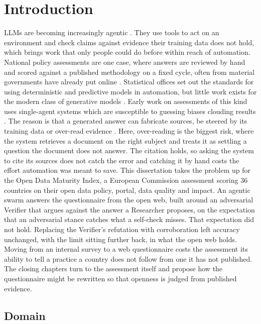 \chapter{Introduction}\label{ch:introduction}

LLMs are becoming increasingly agentic \citep{nakano2021,yao2023}. They use tools to act on an environment and check claims against evidence their training data does not hold, which brings work that only people could do before within reach of automation. National policy assessments are one case, where answers are reviewed by hand and scored against a published methodology on a fixed cycle, often from material governments have already put online \citep{edp2025}. Statistical offices set out the standards for using deterministic and predictive models in automation, but little work exists for the modern class of generative models \citep{yung2022}. Early work on assessments of this kind uses single-agent systems which are susceptible to guessing biases clouding results \citep{fumega2026,kalai2025}. The reason is that a generated answer can fabricate sources, be steered by its training data or over-read evidence \citep{maynez2020,rashkin2023,longpre2021}. Here, over-reading is the biggest risk, where the system retrieves a document on the right subject and treats it as settling a question the document does not answer. The citation holds, so asking the system to cite its sources does not catch the error and catching it by hand costs the effort automation was meant to save. This dissertation takes the problem up for the Open Data Maturity Index, a European Commission assessment scoring 36 countries on their open data policy, portal, data quality and impact. An agentic swarm answers the questionnaire from the open web, built around an adversarial Verifier that argues against the answer a Researcher proposes, on the expectation that an adversarial stance catches what a self-check misses. That expectation did not hold. Replacing the Verifier's refutation with corroboration left accuracy unchanged, with the limit sitting further back, in what the open web holds. Moving from an internal survey to a web questionnaire costs the assessment its ability to tell a practice a country does not follow from one it has not published. The closing chapters turn to the assessment itself and propose how the questionnaire might be rewritten so that openness is judged from published evidence.

\section{Domain}\label{sec:domain}

